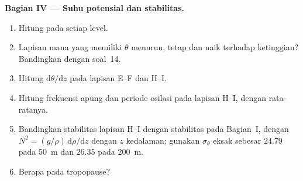 \begin{problem}
\medskip
\noindent\textbf{Bagian IV --- Suhu potensial dan stabilitas.}
\begin{enumerate}[resume]
  \item Hitung  pada setiap level.
  \item Lapisan mana yang memiliki $\theta$ menurun, tetap dan naik terhadap ketinggian?
        Bandingkan dengan soal~14.
  \item Hitung $\mathrm d\theta/\mathrm dz$ pada lapisan E--F dan H--I.
  \item Hitung frekuensi apung dan periode osilasi pada lapisan H--I, dengan  rata-ratanya.
  \item Bandingkan stabilitas lapisan H--I dengan stabilitas  pada Bagian~I,
        dengan $N^2 = (g/\rho)\,\mathrm d\rho/\mathrm dz$ dengan $z$ kedalaman; gunakan
        $\sigma_\theta$ eksak sebesar $24.79$ pada \qty{50}{m} dan $26.35$ pada
        \qty{200}{m}.
  \item Berapa  pada tropopause?
\end{enumerate}
\end{problem}
